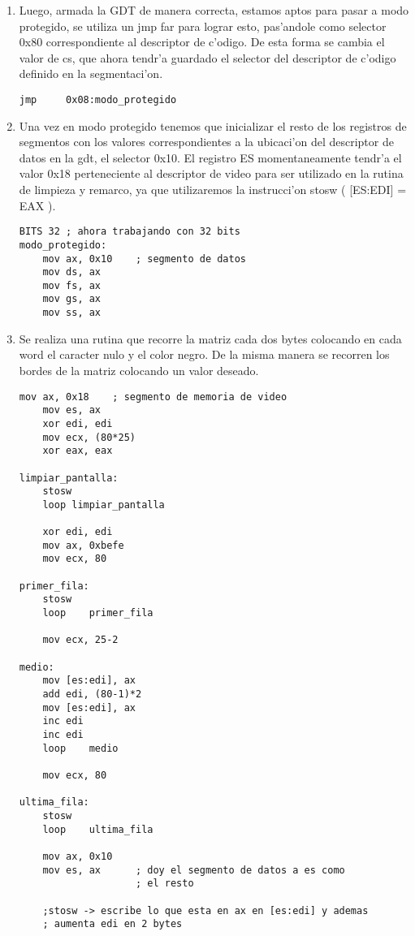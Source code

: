 \documentclass[11pt]{article}
\begin{document}
\begin{enumerate}
\item
Luego, armada la GDT de manera correcta, estamos aptos para pasar a modo protegido, se utiliza un jmp far para lograr esto, pas'andole como selector 0x80 correspondiente al descriptor de c'odigo. De esta forma se cambia el valor de cs, que ahora tendr'a guardado el selector del descriptor de c'odigo definido en la segmentaci'on.
\begin{lstlisting}[frame=single]
	jmp		0x08:modo_protegido
\end{lstlisting}

\item
Una vez en modo protegido tenemos que inicializar el resto de los registros de segmentos con los valores correspondientes a la ubicaci'on del descriptor de datos en la gdt, el selector 0x10. El registro ES momentaneamente tendr'a el valor 0x18 perteneciente al descriptor de video para ser utilizado en la rutina de limpieza y remarco, ya que utilizaremos la instrucci'on stosw ( [ES:EDI] = EAX ).
\begin{lstlisting}[frame=single]
BITS 32	; ahora trabajando con 32 bits
modo_protegido:
	mov	ax, 0x10	; segmento de datos
	mov	ds, ax
	mov	fs, ax
	mov	gs, ax
	mov	ss, ax

\end{lstlisting}

\item
Se realiza una rutina que recorre la matriz cada dos bytes colocando en cada word el caracter nulo y el color negro. De la misma manera se recorren los bordes de la matriz colocando un valor deseado.
\begin{lstlisting}[frame=single]
	mov	ax, 0x18	; segmento de memoria de video
	mov	es, ax
	xor	edi, edi
	mov	ecx, (80*25)
	xor eax, eax

limpiar_pantalla:
	stosw
	loop limpiar_pantalla

	xor	edi, edi
	mov	ax, 0xbefe
	mov	ecx, 80

primer_fila:
	stosw
	loop	primer_fila

	mov	ecx, 25-2

medio:
	mov	[es:edi], ax
	add	edi, (80-1)*2
	mov	[es:edi], ax
	inc	edi
	inc	edi
	loop	medio

	mov	ecx, 80

ultima_fila:
	stosw
	loop	ultima_fila

	mov	ax, 0x10
	mov	es, ax		; doy el segmento de datos a es como 
					; el resto

	;stosw -> escribe lo que esta en ax en [es:edi] y ademas
	; aumenta edi en 2 bytes
\end{lstlisting}

\end{enumerate}
\end{document}
